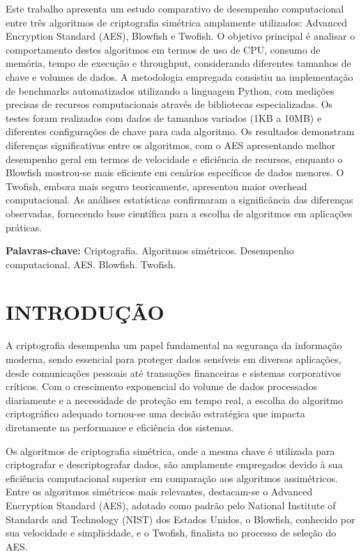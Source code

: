 \documentclass[12pt,a4paper,oneside]{article}
\begin{document}
Este trabalho apresenta um estudo comparativo de desempenho computacional entre três algoritmos de criptografia simétrica amplamente utilizados: Advanced Encryption Standard (AES), Blowfish e Twofish. O objetivo principal é analisar o comportamento destes algoritmos em termos de uso de CPU, consumo de memória, tempo de execução e throughput, considerando diferentes tamanhos de chave e volumes de dados. A metodologia empregada consistiu na implementação de benchmarks automatizados utilizando a linguagem Python, com medições precisas de recursos computacionais através de bibliotecas especializadas. Os testes foram realizados com dados de tamanhos variados (1KB a 10MB) e diferentes configurações de chave para cada algoritmo. Os resultados demonstram diferenças significativas entre os algoritmos, com o AES apresentando melhor desempenho geral em termos de velocidade e eficiência de recursos, enquanto o Blowfish mostrou-se mais eficiente em cenários específicos de dados menores. O Twofish, embora mais seguro teoricamente, apresentou maior overhead computacional. As análises estatísticas confirmaram a significância das diferenças observadas, fornecendo base científica para a escolha de algoritmos em aplicações práticas.

\vspace{0.5cm}
\noindent\textbf{Palavras-chave:} Criptografia. Algoritmos simétricos. Desempenho computacional. AES. Blowfish. Twofish.

\newpage
\tableofcontents

\newpage
\section{INTRODUÇÃO}

A criptografia desempenha um papel fundamental na segurança da informação moderna, sendo essencial para proteger dados sensíveis em diversas aplicações, desde comunicações pessoais até transações financeiras e sistemas corporativos críticos. Com o crescimento exponencial do volume de dados processados diariamente e a necessidade de proteção em tempo real, a escolha do algoritmo criptográfico adequado tornou-se uma decisão estratégica que impacta diretamente na performance e eficiência dos sistemas.

Os algoritmos de criptografia simétrica, onde a mesma chave é utilizada para criptografar e descriptografar dados, são amplamente empregados devido à sua eficiência computacional superior em comparação aos algoritmos assimétricos. Entre os algoritmos simétricos mais relevantes, destacam-se o Advanced Encryption Standard (AES), adotado como padrão pelo National Institute of Standards and Technology (NIST) dos Estados Unidos, o Blowfish, conhecido por sua velocidade e simplicidade, e o Twofish, finalista no processo de seleção do AES.
\end{document}
